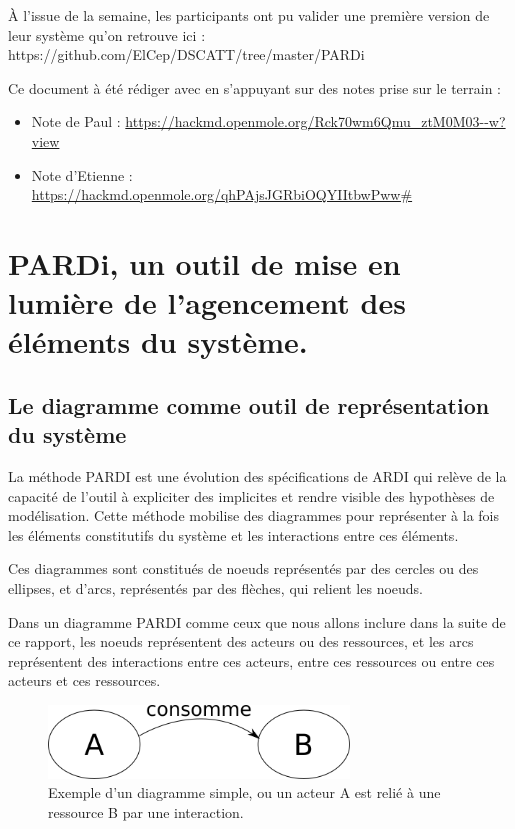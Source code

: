 À l'issue de la semaine, les participants ont pu valider une première version de leur système qu'on retrouve ici : https://github.com/ElCep/DSCATT/tree/master/PARDi

Ce document à été rédiger avec en s'appuyant sur des notes prise sur le terrain :
\begin{itemize}
  \item Note de Paul : \url{https://hackmd.openmole.org/Rck70wm6Qmu_ztM0M03--w?view}
  \item Note d'Etienne : \url{https://hackmd.openmole.org/qhPAjsJGRbiOQYIItbwPww#}
\end{itemize}


\section{PARDi, un outil de mise en lumière de l'agencement des éléments du système.}

\subsection{Le diagramme comme outil de représentation du système}

La méthode PARDI est une évolution des spécifications de ARDI\cite{etienne_ardi_2011} qui relève de la capacité de l'outil à expliciter des implicites et rendre visible des  hypothèses de modélisation. Cette méthode mobilise des diagrammes pour représenter à la fois les éléments constitutifs du système et les interactions entre ces éléments.

Ces diagrammes sont constitués de noeuds représentés par des cercles ou des ellipses, et d'arcs, représentés par des flèches, qui relient les noeuds.

Dans un diagramme PARDI comme ceux que nous allons inclure dans la suite de ce rapport, les noeuds représentent des acteurs ou des ressources, et les arcs représentent des interactions entre ces acteurs, entre ces ressources ou entre ces acteurs et ces ressources.

\begin{figure}[h!]
  \begin{center}
    \includegraphics[width=8cm]{img/diagramme_simple.png}
  \end{center}
  \caption{Exemple d'un diagramme simple, ou un acteur A est relié à une ressource B par une interaction.}
  \label{simple_interac}
\end{figure}


